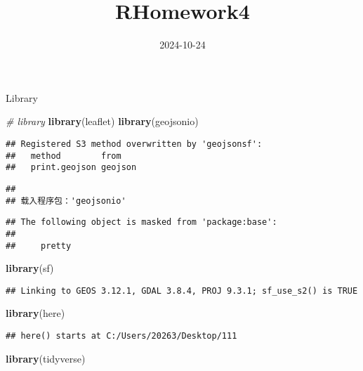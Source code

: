 \documentclass[
]{article}
\title{RHomework4}
\author{}
\date{\vspace{-2.5em}2024-10-24}
\newenvironment{Shaded}{\begin{snugshade}}{\end{snugshade}}
\newcommand{\CommentTok}[1]{\textcolor[rgb]{0.56,0.35,0.01}{\textit{#1}}}
\newcommand{\FunctionTok}[1]{\textcolor[rgb]{0.13,0.29,0.53}{\textbf{#1}}}
\newcommand{\NormalTok}[1]{#1}
\begin{document}
\maketitle

Library

\begin{Shaded}
\begin{Highlighting}[]
\CommentTok{\# library}
\FunctionTok{library}\NormalTok{(leaflet)}
\FunctionTok{library}\NormalTok{(geojsonio)}
\end{Highlighting}
\end{Shaded}

\begin{verbatim}
## Registered S3 method overwritten by 'geojsonsf':
##   method        from   
##   print.geojson geojson
\end{verbatim}

\begin{verbatim}
## 
## 载入程序包：'geojsonio'
\end{verbatim}

\begin{verbatim}
## The following object is masked from 'package:base':
## 
##     pretty
\end{verbatim}

\begin{Shaded}
\begin{Highlighting}[]
\FunctionTok{library}\NormalTok{(sf)}
\end{Highlighting}
\end{Shaded}

\begin{verbatim}
## Linking to GEOS 3.12.1, GDAL 3.8.4, PROJ 9.3.1; sf_use_s2() is TRUE
\end{verbatim}

\begin{Shaded}
\begin{Highlighting}[]
\FunctionTok{library}\NormalTok{(here)}
\end{Highlighting}
\end{Shaded}

\begin{verbatim}
## here() starts at C:/Users/20263/Desktop/111
\end{verbatim}

\begin{Shaded}
\begin{Highlighting}[]
\FunctionTok{library}\NormalTok{(tidyverse)}
\end{Highlighting}
\end{Shaded}
\end{document}
